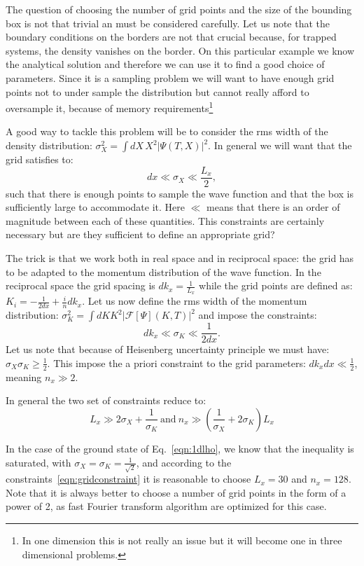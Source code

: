 \documentclass[12pt,a4paper]{report}
\newcommand{\abs}[1]{\left|#1\right|}
\newcommand{\fft}[1]{\mathcal{F}\left[#1\right]}
\begin{document}
The question of choosing the number of grid points and the size of the bounding box is not that trivial an must be considered carefully.
Let us note that the boundary conditions on the borders are not that crucial because, for trapped systems, the density vanishes on the border.
On this particular example we know the analytical solution and therefore we can use it to find a good choice of parameters.
Since it is a sampling problem we will want to have enough grid points not to under sample the distribution but cannot really afford to oversample it, because of memory requirements\footnote{In one dimension this is not really an issue but it will become one in three dimensional problems.}

A good way to tackle this problem will be to consider the rms width of the density distribution: $\sigma_X^2=\int dX\,X^2\abs{\Psi(T,X)}^2$.
In general we will want that the grid satisfies to:
\begin{equation}
dx\ll\sigma_X\ll\frac{L_x}{2},
\end{equation}
such that there is enough points to sample the wave function and that the box is sufficiently large to accommodate it.
Here $\ll$ means that there is an order of magnitude between each of these quantities.
This constraints are certainly necessary but are they sufficient to define an appropriate grid?

The trick is that we work both in real space and in reciprocal space: the grid has to be adapted to the momentum distribution of the wave function.
In the reciprocal space the grid spacing is $dk_x=\frac{1}{L_x}$ while the grid points are defined as: $K_i=-\frac{1}{2dx}+\frac{i}{n}dk_x$.
Let us now define the rms width of the momentum distribution: $\sigma_K^2=\int dK K^2\abs{\fft{\Psi}(K,T)}^2$ and impose the constraints:
\begin{equation}
dk_x\ll\sigma_K\ll\frac{1}{2dx}.
\end{equation}
Let us note that because of Heisenberg uncertainty principle we must have: $\sigma_X\sigma_K\geq\frac{1}{2}$. This impose the a priori constraint to the grid parameters: $dk_x dx\ll\frac{1}{2}$, meaning $n_x\gg2$.

In general the two set of constraints reduce to:
\begin{equation}
L_x\gg2\sigma_X+\frac{1}{\sigma_K}
~\textrm{and}~
n_x\gg\left(\frac{1}{\sigma_X}+2\sigma_K\right)L_x
\label{eqn:gridconstraint}
\end{equation}

In the case of the ground state of Eq.~\eqref{eqn:1dlho}, we know that the inequality is saturated, with $\sigma_X=\sigma_K=\frac{1}{\sqrt{2}}$, and according to the constraints~\eqref{eqn:gridconstraint} it is reasonable to choose $L_x=30$ and $n_x=128$.
Note that it is always better to choose a number of grid points in the form of a power of 2, as fast Fourier transform algorithm are optimized for this case.
\end{document}
